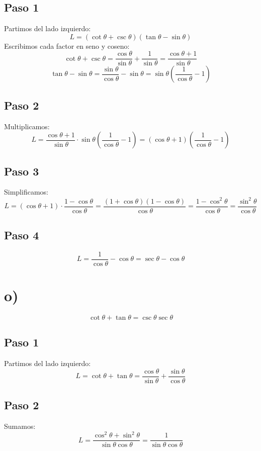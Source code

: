 \documentclass[12pt,a4paper]{article}
\begin{document}
\subsection*{Paso 1}
Partimos del lado izquierdo:
\[
L = (\cot\theta+\csc\theta)(\tan\theta-\sin\theta)
\]
Escribimos cada factor en seno y coseno:
\[
\cot\theta+\csc\theta = \frac{\cos\theta}{\sin\theta} + \frac1{\sin\theta} = \frac{\cos\theta+1}{\sin\theta}
\]
\[
\tan\theta-\sin\theta = \frac{\sin\theta}{\cos\theta} - \sin\theta = \sin\theta\left(\frac1{\cos\theta}-1\right)
\]

\subsection*{Paso 2}
Multiplicamos:
\[
L = \frac{\cos\theta+1}{\sin\theta} \cdot \sin\theta\left(\frac1{\cos\theta}-1\right)
= (\cos\theta+1)\left(\frac1{\cos\theta}-1\right)
\]

\subsection*{Paso 3}
Simplificamos:
\[
L = (\cos\theta+1)\cdot\frac{1-\cos\theta}{\cos\theta}
= \frac{(1+\cos\theta)(1-\cos\theta)}{\cos\theta}
= \frac{1-\cos^2\theta}{\cos\theta}
= \frac{\sin^2\theta}{\cos\theta}
\]

\subsection*{Paso 4}
\[
L = \frac1{\cos\theta} - \cos\theta = \sec\theta - \cos\theta
\]

\newpage
\section*{o)}

\begin{identidad}
\[
\cot\theta+\tan\theta
=
\csc\theta\sec\theta
\]
\end{identidad}

\subsection*{Paso 1}
Partimos del lado izquierdo:
\[
L = \cot\theta+\tan\theta = \frac{\cos\theta}{\sin\theta} + \frac{\sin\theta}{\cos\theta}
\]

\subsection*{Paso 2}
Sumamos:
\[
L = \frac{\cos^2\theta+\sin^2\theta}{\sin\theta\cos\theta}
= \frac{1}{\sin\theta\cos\theta}
\]
\end{document}
